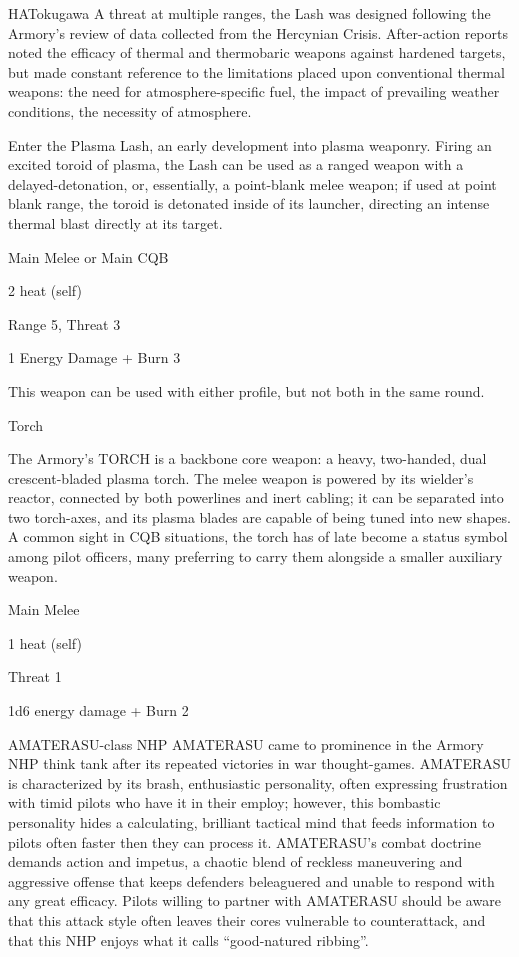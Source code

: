 \begin{mech}{HA}{Tokugawa}
A threat at multiple ranges, the Lash was designed following the Armory’s review of data collected from the Hercynian Crisis. After-action reports noted the efficacy of thermal and thermobaric weapons against hardened targets, but made constant reference to the limitations placed upon conventional thermal weapons: the need for atmosphere-specific fuel, the impact of prevailing weather conditions, the necessity
of atmosphere.

Enter the Plasma Lash, an early development into plasma weaponry. Firing an excited toroid of plasma, the Lash can be used as a ranged weapon with a delayed-detonation, or, essentially, a point-blank melee weapon; if used at point blank range, the toroid is detonated inside of its launcher, directing an intense thermal blast directly at its target.

Main Melee or Main CQB

2 heat (self)

Range 5, Threat 3

1 Energy Damage + Burn 3

This weapon can be used with either profile, but not both in the same round.


Torch

The Armory’s TORCH is a backbone core weapon: a heavy, two-handed, dual crescent-bladed plasma torch. The melee weapon is powered by its wielder’s reactor, connected by both powerlines and inert cabling; it can be separated into two torch-axes, and its plasma blades are capable of being tuned into new shapes. A common sight in CQB situations, the torch has of late become a status symbol among pilot officers, many preferring to carry them alongside a smaller auxiliary weapon.

Main Melee

1 heat (self)

Threat 1

1d6 energy damage + Burn 2


AMATERASU-class NHP
AMATERASU came to prominence in the Armory NHP think tank after its repeated victories in war thought-games. AMATERASU is characterized by its brash, enthusiastic personality, often expressing frustration with timid pilots who have it in their employ; however, this bombastic personality hides a calculating, brilliant tactical mind that feeds information to pilots often faster then they can process it. AMATERASU’s combat doctrine demands action and impetus, a chaotic blend of reckless maneuvering and aggressive offense that keeps defenders beleaguered and unable to respond with any great efficacy. Pilots willing to partner with AMATERASU should be aware that this attack style often leaves their cores vulnerable to counterattack, and that this NHP enjoys what it calls “good-natured ribbing”.


\end{mech}
